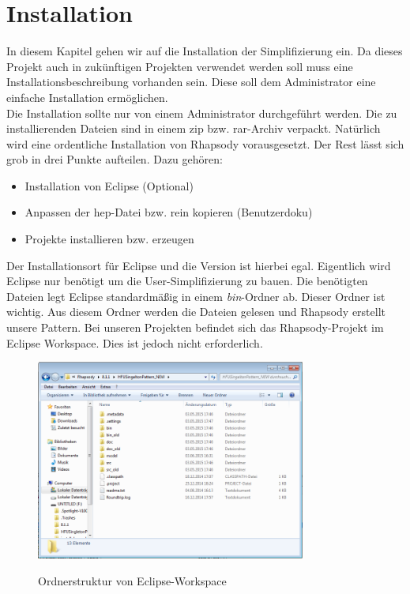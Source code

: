 \chapter{Installation}
In diesem Kapitel gehen wir auf die Installation der Simplifizierung ein. Da
dieses Projekt auch in zukünftigen Projekten verwendet werden soll muss eine
Installationsbeschreibung vorhanden sein. Diese soll dem Administrator eine
einfache Installation ermöglichen.\\
Die Installation sollte nur von einem Administrator durchgeführt werden. 
Die zu installierenden Dateien sind in einem zip bzw. rar-Archiv verpackt. 
Natürlich wird eine ordentliche Installation von Rhapsody vorausgesetzt. Der
Rest lässt sich grob in drei Punkte aufteilen.
Dazu gehören:
\begin{itemize}
  \item Installation von Eclipse (Optional)
  \item Anpassen der hep-Datei bzw. rein kopieren (Benutzerdoku)
  \item Projekte installieren bzw. erzeugen
\end{itemize}
Der Installationsort für Eclipse und die Version ist hierbei egal. Eigentlich
wird Eclipse nur benötigt um die User-Simplifizierung zu bauen. Die benötigten
Dateien legt Eclipse standardmäßig in einem \textit{bin}-Ordner ab. Dieser Ordner ist
wichtig. Aus diesem Ordner werden die Dateien gelesen und Rhapsody erstellt
unsere Pattern. Bei unseren Projekten befindet sich das Rhapsody-Projekt im
Eclipse Workspace. Dies ist jedoch nicht erforderlich. 
\begin{figure}[H]
	\centering
	\includegraphics[width=0.79\textwidth]{content/pictures/install/struktur.png}
	\label{pic:bild}
	\caption{Ordnerstruktur von Eclipse-Workspace}
\end{figure}
